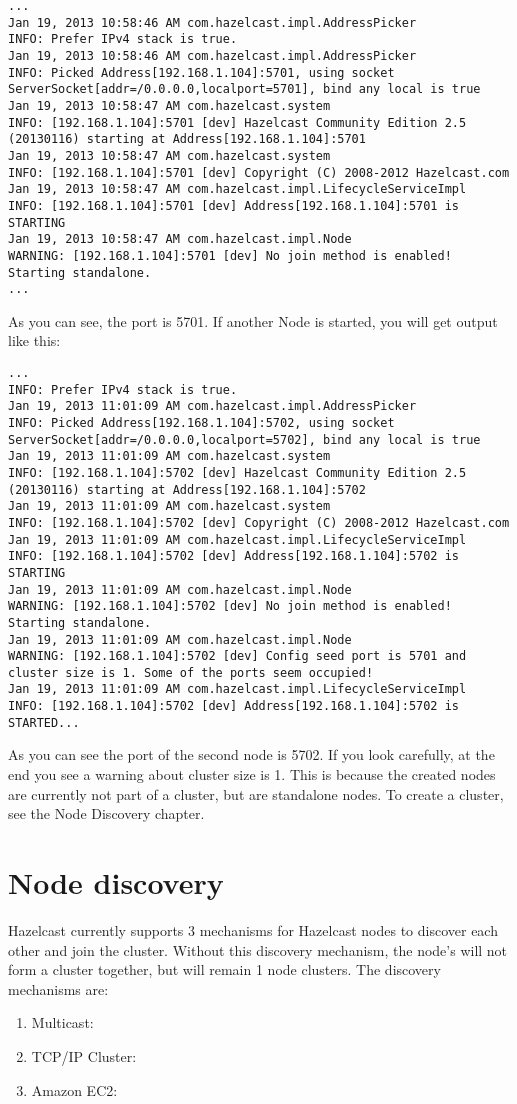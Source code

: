 \begin{lstlisting}
...
Jan 19, 2013 10:58:46 AM com.hazelcast.impl.AddressPicker
INFO: Prefer IPv4 stack is true.
Jan 19, 2013 10:58:46 AM com.hazelcast.impl.AddressPicker
INFO: Picked Address[192.168.1.104]:5701, using socket ServerSocket[addr=/0.0.0.0,localport=5701], bind any local is true
Jan 19, 2013 10:58:47 AM com.hazelcast.system
INFO: [192.168.1.104]:5701 [dev] Hazelcast Community Edition 2.5 (20130116) starting at Address[192.168.1.104]:5701
Jan 19, 2013 10:58:47 AM com.hazelcast.system
INFO: [192.168.1.104]:5701 [dev] Copyright (C) 2008-2012 Hazelcast.com
Jan 19, 2013 10:58:47 AM com.hazelcast.impl.LifecycleServiceImpl
INFO: [192.168.1.104]:5701 [dev] Address[192.168.1.104]:5701 is STARTING
Jan 19, 2013 10:58:47 AM com.hazelcast.impl.Node
WARNING: [192.168.1.104]:5701 [dev] No join method is enabled! Starting standalone.
...
\end{lstlisting}
As you can see, the port is 5701. If another Node is started, you will get output like this:
\begin{lstlisting}
...
INFO: Prefer IPv4 stack is true.
Jan 19, 2013 11:01:09 AM com.hazelcast.impl.AddressPicker
INFO: Picked Address[192.168.1.104]:5702, using socket ServerSocket[addr=/0.0.0.0,localport=5702], bind any local is true
Jan 19, 2013 11:01:09 AM com.hazelcast.system
INFO: [192.168.1.104]:5702 [dev] Hazelcast Community Edition 2.5 (20130116) starting at Address[192.168.1.104]:5702
Jan 19, 2013 11:01:09 AM com.hazelcast.system
INFO: [192.168.1.104]:5702 [dev] Copyright (C) 2008-2012 Hazelcast.com
Jan 19, 2013 11:01:09 AM com.hazelcast.impl.LifecycleServiceImpl
INFO: [192.168.1.104]:5702 [dev] Address[192.168.1.104]:5702 is STARTING
Jan 19, 2013 11:01:09 AM com.hazelcast.impl.Node
WARNING: [192.168.1.104]:5702 [dev] No join method is enabled! Starting standalone.
Jan 19, 2013 11:01:09 AM com.hazelcast.impl.Node
WARNING: [192.168.1.104]:5702 [dev] Config seed port is 5701 and cluster size is 1. Some of the ports seem occupied!
Jan 19, 2013 11:01:09 AM com.hazelcast.impl.LifecycleServiceImpl
INFO: [192.168.1.104]:5702 [dev] Address[192.168.1.104]:5702 is STARTED...
\end{lstlisting}
As you can see the port of the second node is 5702. If you look carefully, at the end you see a warning about cluster size is 1. This is because the created nodes are currently not part of a cluster, but are standalone nodes. To create a cluster, see the Node Discovery chapter.

\section{Node discovery}
Hazelcast currently supports 3 mechanisms for Hazelcast nodes to discover each other and join the cluster. Without this discovery mechanism, the node's will not form a cluster together, but will remain 1 node clusters. The discovery mechanisms are:
\begin{enumerate}
\item Multicast:
\item TCP/IP Cluster:
\item Amazon EC2:
\end{enumerate}

